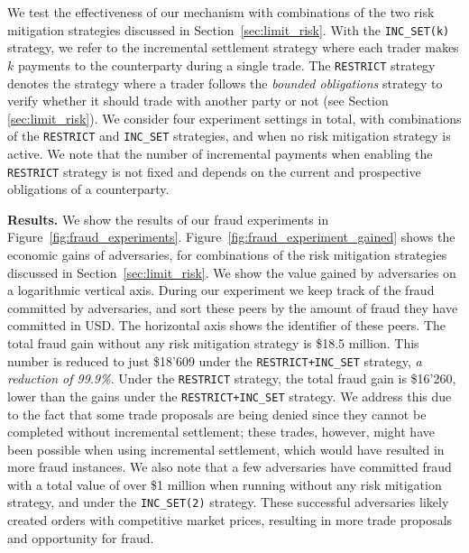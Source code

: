 We test the effectiveness of our mechanism with combinations of the two risk mitigation strategies discussed in Section~\ref{sec:limit_risk}.
With the \texttt{INC\_SET(k)} strategy, we refer to the incremental settlement strategy where each trader makes $ k $ payments to the counterparty during a single trade.
The \texttt{RESTRICT} strategy denotes the strategy where a trader follows the \emph{bounded obligations} strategy to verify whether it should trade with another party or not (see Section \ref{sec:limit_risk}).
We consider four experiment settings in total, with combinations of the \texttt{RESTRICT} and \texttt{INC\_SET} strategies, and when no risk mitigation strategy is active.
We note that the number of incremental payments when enabling the \texttt{RESTRICT} strategy is not fixed and depends on the current and prospective obligations of a counterparty.

\textbf{Results.}
We show the results of our fraud experiments in Figure~\ref{fig:fraud_experiments}.
Figure~\ref{fig:fraud_experiment_gained} shows the economic gains of adversaries, for combinations of the risk mitigation strategies discussed in Section~\ref{sec:limit_risk}.
We show the value gained by adversaries on a logarithmic vertical axis.
During our experiment we keep track of the fraud committed by adversaries, and sort these peers by the amount of fraud they have committed in USD.
The horizontal axis shows the identifier of these peers.
The total fraud gain without any risk mitigation strategy is \$18.5 million.
This number is reduced to just \$18'609 under the \texttt{RESTRICT+INC\_SET} strategy, \emph{a reduction of 99.9\%}.
Under the \texttt{RESTRICT} strategy, the total fraud gain is \$16'260, lower than the gains under the \texttt{RESTRICT+INC\_SET} strategy.
We address this due to the fact that some trade proposals are being denied since they cannot be completed without incremental settlement; these trades, however, might have been possible when using incremental settlement, which would have resulted in more fraud instances.
We also note that a few adversaries have committed fraud with a total value of over \$1 million when running without any risk mitigation strategy, and under the \texttt{INC\_SET(2)} strategy.
These successful adversaries likely created orders with competitive market prices, resulting in more trade proposals and opportunity for fraud.

